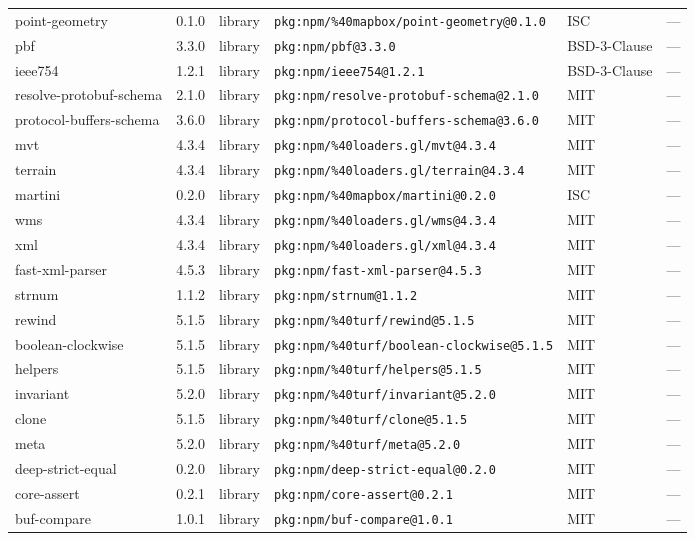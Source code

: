 \documentclass[11pt]{article}
\begin{document}
\begin{longtable}{|l|l|l|p{2.2cm}|l|p{4cm}|}
point-geometry & 0.1.0 & library & \texttt{pkg:npm/\%40mapbox/point-geometry@0.1.0} & ISC & — \\
pbf & 3.3.0 & library & \texttt{pkg:npm/pbf@3.3.0} & BSD-3-Clause & — \\
ieee754 & 1.2.1 & library & \texttt{pkg:npm/ieee754@1.2.1} & BSD-3-Clause & — \\
resolve-protobuf-schema & 2.1.0 & library & \texttt{pkg:npm/resolve-protobuf-schema@2.1.0} & MIT & — \\
protocol-buffers-schema & 3.6.0 & library & \texttt{pkg:npm/protocol-buffers-schema@3.6.0} & MIT & — \\
mvt & 4.3.4 & library & \texttt{pkg:npm/\%40loaders.gl/mvt@4.3.4} & MIT & — \\
terrain & 4.3.4 & library & \texttt{pkg:npm/\%40loaders.gl/terrain@4.3.4} & MIT & — \\
martini & 0.2.0 & library & \texttt{pkg:npm/\%40mapbox/martini@0.2.0} & ISC & — \\
wms & 4.3.4 & library & \texttt{pkg:npm/\%40loaders.gl/wms@4.3.4} & MIT & — \\
xml & 4.3.4 & library & \texttt{pkg:npm/\%40loaders.gl/xml@4.3.4} & MIT & — \\
fast-xml-parser & 4.5.3 & library & \texttt{pkg:npm/fast-xml-parser@4.5.3} & MIT & — \\
strnum & 1.1.2 & library & \texttt{pkg:npm/strnum@1.1.2} & MIT & — \\
rewind & 5.1.5 & library & \texttt{pkg:npm/\%40turf/rewind@5.1.5} & MIT & — \\
boolean-clockwise & 5.1.5 & library & \texttt{pkg:npm/\%40turf/boolean-clockwise@5.1.5} & MIT & — \\
helpers & 5.1.5 & library & \texttt{pkg:npm/\%40turf/helpers@5.1.5} & MIT & — \\
invariant & 5.2.0 & library & \texttt{pkg:npm/\%40turf/invariant@5.2.0} & MIT & — \\
clone & 5.1.5 & library & \texttt{pkg:npm/\%40turf/clone@5.1.5} & MIT & — \\
meta & 5.2.0 & library & \texttt{pkg:npm/\%40turf/meta@5.2.0} & MIT & — \\
deep-strict-equal & 0.2.0 & library & \texttt{pkg:npm/deep-strict-equal@0.2.0} & MIT & — \\
core-assert & 0.2.1 & library & \texttt{pkg:npm/core-assert@0.2.1} & MIT & — \\
buf-compare & 1.0.1 & library & \texttt{pkg:npm/buf-compare@1.0.1} & MIT & — \\

\end{longtable}
\end{document}
